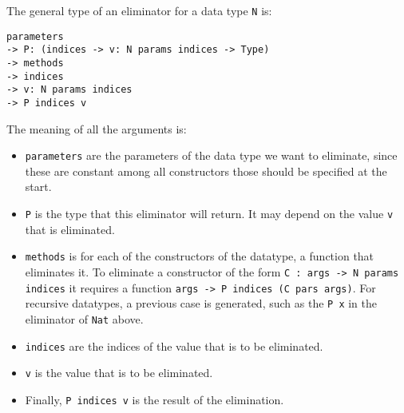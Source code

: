 The general type of an eliminator for a data type \verb|N| is:
\begin{lstlisting}
parameters 
-> P: (indices -> v: N params indices -> Type) 
-> methods
-> indices
-> v: N params indices
-> P indices v
\end{lstlisting}
The meaning of all the arguments is:
\begin{itemize}
	\item \verb|parameters| are the parameters of the data type we want to eliminate, since these are constant among all constructors those should be specified at the start.
	\item \verb|P| is the type that this eliminator will return. It may depend on the value \verb|v| that is eliminated.
	\item \verb|methods| is for each of the constructors of the datatype, a function that eliminates it. To eliminate a constructor of the form \verb|C : args -> N params indices| it requires a function \verb|args -> P indices (C pars args)|. For recursive datatypes, a previous case is generated, such as the \verb|P x| in the eliminator of \verb|Nat| above.
	\item \verb|indices| are the indices of the value that is to be eliminated.
	\item \verb|v| is the value that is to be eliminated.
	\item Finally, \verb|P indices v| is the result of the elimination.
\end{itemize}

